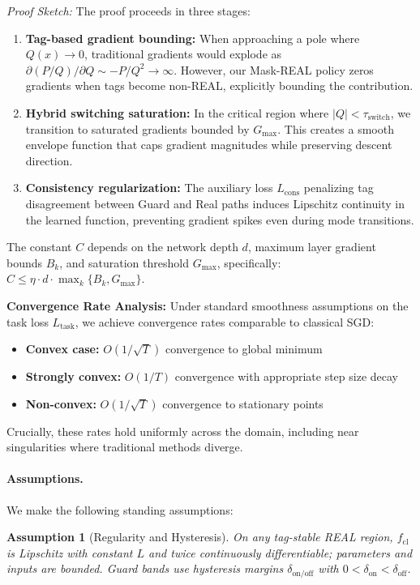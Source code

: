 \documentclass[twoside,11pt]{article}
\newtheorem{assumption}{Assumption}
\newcommand{\trReal}{\textsc{REAL}}
\newcommand{\TAGREAL}{\trReal}
\begin{document}
\emph{Proof Sketch:} The proof proceeds in three stages:
\begin{enumerate}
\item \textbf{Tag-based gradient bounding:} When approaching a pole where $Q(x) \to 0$, traditional gradients would explode as $\partial(P/Q)/\partial Q \sim -P/Q^2 \to \infty$. However, our Mask-REAL policy zeros gradients when tags become non-\TAGREAL{}, explicitly bounding the contribution.
\item \textbf{Hybrid switching saturation:} In the critical region where $|Q| < \tau_{\text{switch}}$, we transition to saturated gradients bounded by $G_{\max}$. This creates a smooth envelope function that caps gradient magnitudes while preserving descent direction.
\item \textbf{Consistency regularization:} The auxiliary loss $L_{\text{cons}}$ penalizing tag disagreement between Guard and Real paths induces Lipschitz continuity in the learned function, preventing gradient spikes even during mode transitions.
\end{enumerate}

The constant $C$ depends on the network depth $d$, maximum layer gradient bounds $B_k$, and saturation threshold $G_{\max}$, specifically: $C \leq \eta \cdot d \cdot \max_k\{B_k, G_{\max}\}$.

\textbf{Convergence Rate Analysis:}
Under standard smoothness assumptions on the task loss $L_{\text{task}}$, we achieve convergence rates comparable to classical SGD:
\begin{itemize}
\item \textbf{Convex case:} $O(1/\sqrt{T})$ convergence to global minimum
\item \textbf{Strongly convex:} $O(1/T)$ convergence with appropriate step size decay
\item \textbf{Non-convex:} $O(1/\sqrt{T})$ convergence to stationary points
\end{itemize}

Crucially, these rates hold uniformly across the domain, including near singularities where traditional methods diverge.

\paragraph{Assumptions.} We make the following standing assumptions:
\begin{assumption}[Regularity and Hysteresis]\label{ass:regularity}
On any tag-stable \TAGREAL{} region, $f_{\mathrm{cl}}$ is Lipschitz with constant $L$ and twice continuously differentiable; parameters and inputs are bounded. Guard bands use hysteresis margins $\delta_{\mathrm{on/off}}$ with $0<\delta_{\mathrm{on}}<\delta_{\mathrm{off}}$.
\end{assumption}
\end{document}
